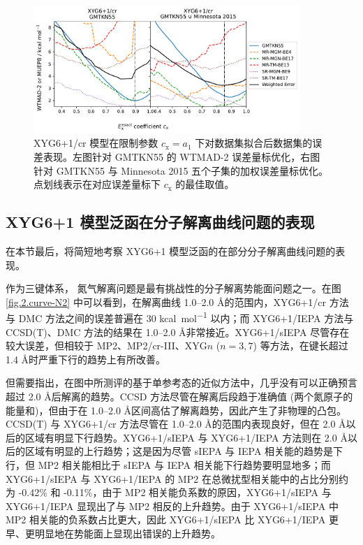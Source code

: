 \begin{figure}[h]
  \centering
  \includegraphics[width=0.9\textwidth]{assets/plot-seq-cr.pdf}
  \caption{XYG6+1/cr 模型在限制参数 $c_\mathrm{x} = a_1$ 下对数据集拟合后数据集的误差表现。左图针对 GMTKN55 的 WTMAD-2 误差量标优化，右图针对 GMTKN55 与 Minnesota 2015 五个子集的加权误差量标优化。点划线表示在对应误差量标下 $c_\mathrm{x}$ 的最佳取值。}
  \label{fig.2.plot-seq-xyg7}
\end{figure}

\subsection{XYG6+1 模型泛函在分子解离曲线问题的表现}

在本节最后，将简短地考察 XYG6+1 模型泛函的在部分分子解离曲线问题的表现。

作为三键体系， 氮气解离问题是最有挑战性的分子解离势能面问题之一。在图 \ref{fig.2.curve-N2} 中可以看到，在解离曲线 1.0--2.0 \AA 的范围内，XYG6+1/cr 方法与 DMC 方法之间的误差普遍在 30 \si{kcal.mol^{-1}} 以内；而 XYG6+1/IEPA 方法与 CCSD(T)、DMC 方法的结果在 1.0--2.0 \AA 非常接近。XYG6+1/sIEPA 尽管存在较大误差，但相较于 MP2、MP2/cr-III、XYG$n$ ($n=3,7$) 等方法，在键长超过 1.4 \AA 时严重下行的趋势上有所改善。

但需要指出，在图中所测评的基于单参考态的近似方法中，几乎没有可以正确预言超过 2.0 \AA 后解离的趋势。CCSD 方法尽管在解离后段趋于准确值 (两个氮原子的能量和)，但由于在 1.0--2.0 \AA 区间高估了解离趋势，因此产生了非物理的凸包。CCSD(T) 与 XYG6+1/cr 方法尽管在 1.0--2.0 \AA 的范围内表现良好，但在 2.0 \AA 以后的区域有明显下行趋势。XYG6+1/sIEPA 与 XYG6+1/IEPA 方法则在 2.0 \AA 以后的区域有明显的上行趋势；这是因为尽管 sIEPA 与 IEPA 相关能的趋势是下行，但 MP2 相关能相比于 sIEPA 与 IEPA 相关能下行趋势要明显地多；而 XYG6+1/sIEPA 与 XYG6+1/IEPA 的 MP2 在总微扰型相关能中的占比分别约为 -0.42\% 和 -0.11\%，由于 MP2 相关能负系数的原因，XYG6+1/sIEPA 与 XYG6+1/IEPA 显现出了与 MP2 相反的上升趋势。由于 XYG6+1/sIEPA 中 MP2 相关能的负系数占比更大，因此 XYG6+1/sIEPA 比 XYG6+1/IEPA 更早、更明显地在势能面上显现出错误的上升趋势。


